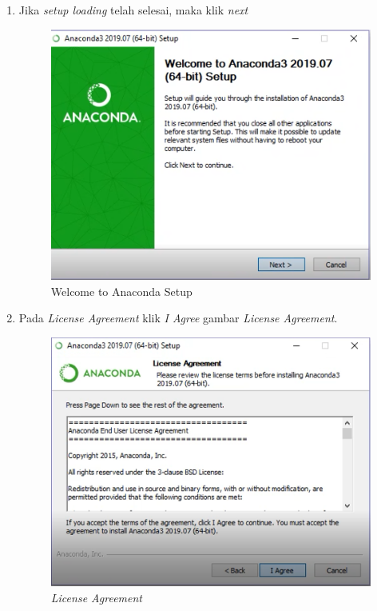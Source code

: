 \begin{enumerate}
\item Jika \textit{setup loading} telah selesai, maka klik \textit{next}
\begin{figure}[H]
        \centerline{\includegraphics[scale=0.5]{figures/3}}
        \caption{Welcome to Anaconda Setup}
		\label{langkah2}
\end{figure}


\item Pada \textit{License Agreement} klik \textit{I Agree}
 gambar \textit{License Agreement}.

\begin{figure}[H]
    \centering
    \includegraphics[scale=0.5]{figures/4}
    \caption{\textit{License Agreement}}
    \label{Figureanaconda3}
\end{figure}



\end{enumerate}
